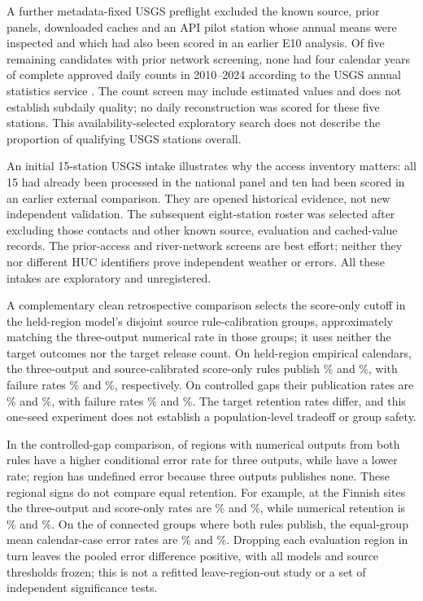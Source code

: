 \documentclass[draft,linenumbers]{agujournal2025}
\begin{document}
A further metadata-fixed USGS preflight excluded the known source, prior panels, downloaded caches and an API pilot station whose annual means were inspected and which had also been scored in an earlier E10 analysis. Of five remaining candidates with prior network screening, none had four calendar years of complete approved daily counts in 2010--2024 according to the USGS annual statistics service \cite{usgsstatistics2026}. The count screen may include estimated values and does not establish subdaily quality; no daily reconstruction was scored for these five stations. This availability-selected exploratory search does not describe the proportion of qualifying USGS stations overall.

An initial 15-station USGS intake illustrates why the access inventory matters: all 15 had already been processed in the national panel and ten had been scored in an earlier external comparison. They are opened historical evidence, not new independent validation. The subsequent eight-station roster was selected after excluding those contacts and other known source, evaluation and cached-value records. The prior-access and river-network screens are best effort; neither they nor different HUC identifiers prove independent weather or errors. All these intakes are exploratory and unregistered.

A complementary clean retrospective comparison selects the score-only cutoff in the held-region model's disjoint source rule-calibration groups, approximately matching the three-output numerical rate in those groups; it uses neither the target outcomes nor the target release count. On held-region empirical calendars, the three-output and source-calibrated score-only rules publish \SRCThreeRetention\% and \SRCScoreRetention\%, with failure rates \SRCThreeRisk\% and \SRCScoreRisk\%, respectively. On controlled gaps their publication rates are \SRCGapThreeRetention\% and \SRCGapScoreRetention\%, with failure rates \SRCGapThreeRisk\% and \SRCGapScoreRisk\%. The target retention rates differ, and this one-seed experiment does not establish a population-level tradeoff or group safety.

In the controlled-gap comparison, \RGGapPositive{} of \RGGapDefined{} regions with numerical outputs from both rules have a higher conditional error rate for three outputs, while \RGGapNegative{} have a lower rate; \RGGapUndefined{} region has undefined error because three outputs publishes none. These regional signs do not compare equal retention. For example, at the Finnish sites the three-output and score-only rates are \RGSykeThreeRisk\% and \RGSykeScoreRisk\%, while numerical retention is \RGSykeThreeRetention\% and \RGSykeScoreRetention\%. On the \RGCommonGroups{} of \RGAllGroups{} connected groups where both rules publish, the equal-group mean calendar-case error rates are \RGThreeGroupRisk\% and \RGScoreGroupRisk\%. Dropping each evaluation region in turn leaves the pooled error difference positive, with all models and source thresholds frozen; this is not a refitted leave-region-out study or a set of independent significance tests.
\end{document}
